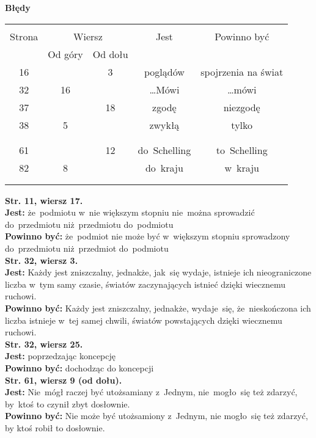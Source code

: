 \documentclass[a4paper,11pt]{article}
\newcommand{\ld}{\ldots}
\newcommand{\tb}{\textbf}
\newcommand{\noi}{\noindent}
\newcommand{\Center}[1]{\begin{center} #1 \end{center}}
\newcommand{\CenterTB}[1]{\Center{\tb{#1}}}
\newcommand{\StrWg}[2]{\tb{Str. #1, wiersz #2.}}
\newcommand{\StrWd}[2]{\tb{Str. #1, wiersz #2 (od dołu).}}
\newcommand{\Jest}{\tb{Jest: }}
\newcommand{\Pow}{\tb{Powinno być: }}
\begin{document}
\CenterTB{Błędy}
\begin{center}
  \begin{tabular}{|c|c|c|c|c|}
    \hline
    & \multicolumn{2}{c|}{} & & \\
    Strona & \multicolumn{2}{c|}{Wiersz}& Jest & Powinno być \\ \cline{2-3}
    & Od góry & Od dołu &  &  \\ \hline
    16 & & 3 & poglądów & spojrzenia na świat \\
    32 & 16 & & \ld Mówi & \ld mówi \\
    37 & & 18 & zgodę & niezgodę \\
    38 & 5 & & zwykłą & tylko \\
    & & & & \\
    & & & & \\
    61 & & 12 & do~Schelling & to~Schelling \\
    82 & 8 & & do~kraju & w~kraju \\
    & & & & \\
    & & & & \\ \hline
  \end{tabular}
\end{center}

\noi
\StrWg{11}{17} \\
\Jest że~podmiotu w~nie większym stopniu nie~można sprowadzić
do~przedmiotu niż~przedmiotu do~podmiotu \\
\Pow że~podmiot nie może być w~większym stopniu sprowadzony
do~przedmiotu niż~przedmiot do~podmiotu \\
\StrWg{32}{3} \\
\Jest Każdy jest zniszczalny, jednakże, jak~się wydaje, istnieje ich
nieograniczone liczba w~tym samy czasie, światów zaczynających istnieć
dzięki wiecznemu ruchowi. \\
\Pow Każdy jest zniszczalny, jednakże, wydaje~się, że~nieskończona ich
liczba istnieje w~tej samej chwili, światów powstających dzięki
wiecznemu ruchowi. \\
\StrWg{32}{25} \\
\Jest poprzedzając koncepcję \\
\Pow dochodząc do koncepcji \\
\StrWd{61}{9} \\
\Jest Nie~mógł raczej być utożsamiany z~Jednym, nie~mogło~się też
zdarzyć,
by~ktoś to czynił zbyt dosłownie. \\
\Pow Nie może być utożsamiony z~Jednym, nie mogło~się też zdarzyć, by
ktoś robił to dosłownie. \\
\end{document}
